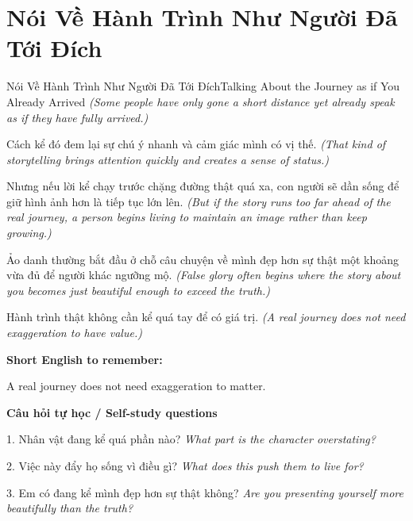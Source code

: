 \section{Nói Về Hành Trình Như Người Đã Tới Đích}
\begin{truyen}{Nói Về Hành Trình Như Người Đã Tới Đích}{Talking About the Journey as if You Already Arrived}
\textit{(Some people have only gone a short distance yet already speak as if they have fully arrived.)}

Cách kể đó đem lại sự chú ý nhanh và cảm giác mình có vị thế.
\textit{(That kind of storytelling brings attention quickly and creates a sense of status.)}

Nhưng nếu lời kể chạy trước chặng đường thật quá xa, con người sẽ dần sống để giữ hình ảnh hơn là tiếp tục lớn lên.
\textit{(But if the story runs too far ahead of the real journey, a person begins living to maintain an image rather than keep growing.)}

Ảo danh thường bắt đầu ở chỗ câu chuyện về mình đẹp hơn sự thật một khoảng vừa đủ để người khác ngưỡng mộ.
\textit{(False glory often begins where the story about you becomes just beautiful enough to exceed the truth.)}

\end{truyen}

\begin{baihoc}
Hành trình thật không cần kể quá tay để có giá trị.
\textit{(A real journey does not need exaggeration to have value.)}
\end{baihoc}

\begin{ghinhoanh}
\textbf{Short English to remember:}

A real journey does not need exaggeration to matter.

\end{ghinhoanh}

\begin{tuhocnhanh}
\textbf{Câu hỏi tự học / Self-study questions}

1. Nhân vật đang kể quá phần nào? \textit{What part is the character overstating?}

2. Việc này đẩy họ sống vì điều gì? \textit{What does this push them to live for?}

3. Em có đang kể mình đẹp hơn sự thật không? \textit{Are you presenting yourself more beautifully than the truth?}
\end{tuhocnhanh}
\ngancach

